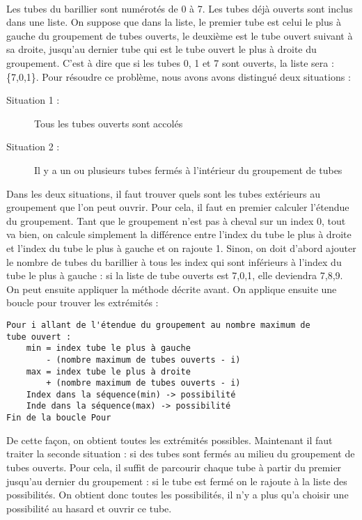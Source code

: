 \paragraph{}Les tubes du barillier sont numérotés de 0 à 7. Les tubes déjà ouverts sont inclus dans une liste. On suppose que dans la liste, le premier tube est celui le plus à gauche
du groupement de tubes ouverts, le deuxième est le tube ouvert suivant à sa droite, jusqu'au dernier tube qui est le tube ouvert le plus à droite du groupement. C'est à dire que si les
tubes 0, 1 et 7 sont ouverts, la liste sera : \{7,0,1\}. Pour résoudre ce problème, nous avons avons distingué deux situations :
\begin{description}
    \item[Situation 1 :] Tous les tubes ouverts sont accolés
    \item[Situation 2 :] Il y a un ou plusieurs tubes fermés à l'intérieur du groupement de tubes
\end{description}
Dans les deux situations, il faut trouver quels sont les tubes extérieurs au groupement que l'on peut ouvrir. Pour cela, il faut en premier calculer l'étendue du groupement. Tant que
le groupement n'est pas à cheval sur un index 0, tout va bien, on calcule simplement la différence entre l'index du tube le plus à droite et l'index du tube le plus à gauche et on
rajoute 1. Sinon, on doit d'abord ajouter le nombre de tubes du barillier à tous les index qui sont inférieurs à l'index du tube le plus à gauche : si la liste de tube ouverts est
{7,0,1}, elle deviendra {7,8,9}. On peut ensuite appliquer la méthode décrite avant. On applique ensuite une boucle pour trouver les extrémités :
\begin{verbatim}
Pour i allant de l'étendue du groupement au nombre maximum de
tube ouvert :
    min = index tube le plus à gauche
        - (nombre maximum de tubes ouverts - i)
    max = index tube le plus à droite
        + (nombre maximum de tubes ouverts - i)
    Index dans la séquence(min) -> possibilité
    Inde dans la séquence(max) -> possibilité
Fin de la boucle Pour
\end{verbatim}
De cette façon, on obtient toutes les extrémités possibles. Maintenant il faut traiter la seconde situation : si des tubes sont fermés au milieu du groupement de tubes ouverts. Pour
cela, il suffit de parcourir chaque tube à partir du premier jusqu'au dernier du groupement : si le tube est fermé on le rajoute à la liste des possibilités. On obtient donc toutes les
possibilités, il n'y a plus qu'a choisir une possibilité au hasard et ouvrir ce tube.

